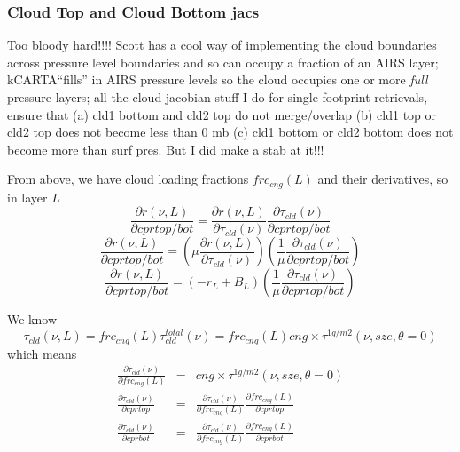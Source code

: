 \documentclass[11pt]{article}
\newcommand{\kc}{\textsf{kCARTA}\xspace}
\begin{document}
\subsubsection{Cloud Top and Cloud Bottom jacs}

Too bloody hard!!!! Scott has a cool way of implementing the cloud
boundaries across pressure level boundaries and so can occupy a
fraction of an AIRS layer; \kc ``fills'' in AIRS pressure levels so
the cloud occupies one or more \textit{full} pressure layers; all the
cloud jacobian stuff I do for single footprint retrievals, ensure that
(a) cld1 bottom and cld2 top do not merge/overlap (b) cld1 top or cld2 top
does not become less than 0 mb (c) cld1 bottom or cld2 bottom does not
become more than surf pres. But I did make a stab at it!!!

From above, we have cloud loading fractions $frc_{cng}(L)$ and their derivatives, so in layer $L$
\[
\frac{\partial r(\nu,L)}{\partial cprtop/bot} = \frac{\partial r(\nu,L)}{\partial \tau_{cld}(\nu)} \frac{\partial \tau_{cld}(\nu)}{\partial cprtop/bot} 
\]
\[
\frac{\partial r(\nu,L)}{\partial cprtop/bot} = 
\left( \mu \frac{\partial r(\nu,L)}{\partial \tau_{cld}(\nu)} \right) \left( \frac{1}{\mu} \frac{\partial \tau_{cld}(\nu)}{\partial cprtop/bot} \right)
\]
\[
\frac{\partial r(\nu,L)}{\partial cprtop/bot} = \left( -r_L + B_L \right) \left( \frac{1}{\mu} \frac{\partial \tau_{cld}(\nu)}{\partial cprtop/bot} \right)
\]

We know 
\[
\tau_{cld}(\nu,L) = frc_{cng}(L) \tau^{total}_{cld}(\nu) =  frc_{cng}(L) cng \times  \tau^{1g/m2}(\nu,sze,\theta = 0)
\]
which means
\begin{eqnarray*}
\frac{\partial \tau_{cld}(\nu)}{\partial frc_{cng}(L)} & = & cng \times  \tau^{1g/m2}(\nu,sze,\theta = 0) \\
\frac{\partial \tau_{cld}(\nu)}{\partial cprtop}       & = & \frac{\partial \tau_{cld}(\nu)}{\partial frc_{cng}(L)} \frac{\partial frc_{cng}(L)}{\partial cprtop} \\
\frac{\partial \tau_{cld}(\nu)}{\partial cprbot}       & = & \frac{\partial \tau_{cld}(\nu)}{\partial frc_{cng}(L)} \frac{\partial frc_{cng}(L)}{\partial cprbot} \\
\end{eqnarray*}
\end{document}
